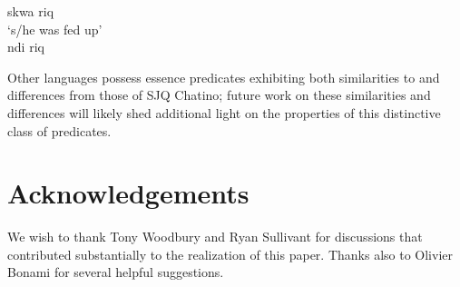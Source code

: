 \documentclass[output=paper]{langsci/langscibook}
\begin{document}
\begin{exe}

	\ex \label{ex:CruzStump:45} {{skwa} {riq} \\ `s/he was fed up'} \\


	\ex \label{ex:CruzStump:46} {{ndi} {riq}  }\\

\end{exe}

Other  languages possess essence predicates exhibiting both similarities to and differences from those of SJQ Chatino; future work on these similarities and differences will likely shed additional light on the properties of this distinctive class of predicates.



\section*{Acknowledgements}
\largerpage
We wish to thank Tony Woodbury and Ryan Sullivant  for discussions that contributed substantially to the realization of this paper.  Thanks also to Olivier Bonami for several helpful suggestions.

{\sloppy
    \printbibliography[heading=subbibliography,notkeyword=this]
}
\end{document}
